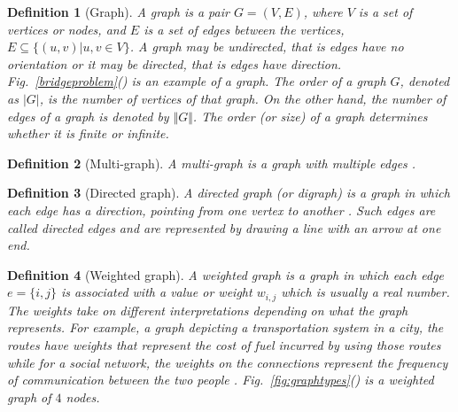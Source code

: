 \documentclass[10pt,a4paper]{article}
\newtheorem{defn}{Definition}
\begin{document}
\begin{defn}[Graph]
	A graph is a pair $G = (V,E)$, where $V$ is a set of vertices or nodes, and $E$ is a set of edges between the vertices, $E \subseteq \{(u, v )|u, v \in V \}$. A graph may be undirected, that is edges have no orientation or it may be directed, that is edges have direction. Fig.~\ref{bridgeproblem}() is an example of a graph.
	The order of a graph $G$, denoted as $|G|$, is the number of vertices of that graph. On the other hand, the number of edges of a graph is denoted by $\Vert G \Vert$. The order (or size) of a graph determines whether it is finite or infinite. 
\end{defn}

\begin{defn}[Multi-graph]
	A multi-graph is a graph with multiple edges \citep{newman2010networks}.
\end{defn}


\begin{defn}[Directed graph]
	A directed graph (or digraph) is a graph in which each edge has a direction, pointing from one vertex to another \citep{newman2010networks}. Such edges are called directed edges and are represented by drawing a line with an arrow at one end. 
\end{defn}


\begin{defn}[Weighted graph]
	A weighted graph is a graph in which each edge $e=\{i,j\}$ is associated with a value or weight $w_{i,j}$ which is usually a real number. The weights take on different interpretations depending on what the graph represents. For example, a graph depicting a transportation system in a city, the routes have weights that represent the cost of fuel incurred by using those routes while for a social network, the weights  on the connections represent the frequency of communication between the two people \citep{newman2010networks}. Fig.~\ref{fig:graphtypes}() is a weighted graph of $4$ nodes.
\end{defn}
\end{document}
